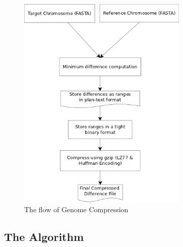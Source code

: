 \documentclass[11pt]{article}
\begin{document}
\begin{figure}
  \begin{center}
    \includegraphics[height=4.1in]{figures/GenomeCompressionFlow.png}
    \caption{The flow of Genome Compression}
    \label{fig:genomecompressionflow}
  \end{center}
\end {figure}

\clearpage

\subsection{The Algorithm}
\end{document}
